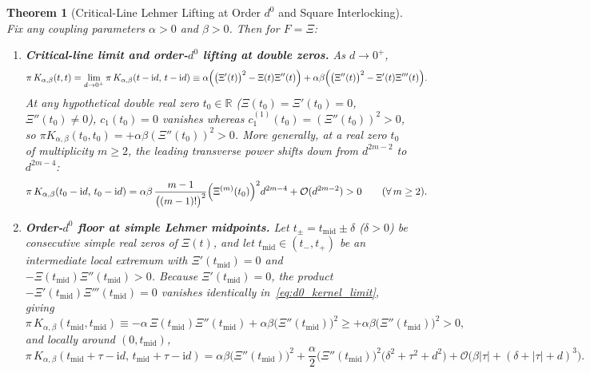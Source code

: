 \documentclass[11pt,reqno]{amsart}
\newtheorem{theorem}{Theorem}[section]
\theoremstyle{definition}
\theoremstyle{remark}
\numberwithin{equation}{section}
\newcommand{\R}{\mathbb{R}}
\newcommand{\ii}{\mathrm{i}}
\newcommand{\fac}{\mathclose{\mathchar"0021}}
\begin{document}
\begin{theorem}[Critical-Line Lehmer Lifting at Order $d^0$ and Square Interlocking]\label{thm:lehmer_lifting}
Fix any coupling parameters $\alpha > 0$ and $\beta > 0$. Then for $F = \Xi$:
\begin{enumerate}[label=\textup{(\roman*)},leftmargin=2.2em]
\item \textbf{Critical-line limit and order-$d^0$ lifting at double zeros.} As $d \to 0^+$,
\begin{equation}\label{eq:d0_kernel_limit}
\pi\,K_{\alpha,\beta}(t,t) = \lim_{d \to 0^+} \pi\,K_{\alpha,\beta}(t - \ii d,\, t - \ii d) \equiv \alpha\Bigl(\bigl(\Xi'(t)\bigr)^2 - \Xi(t)\Xi''(t)\Bigr) + \alpha\beta\Bigl(\bigl(\Xi''(t)\bigr)^2 - \Xi'(t)\Xi'''(t)\Bigr).
\end{equation}
At any hypothetical double real zero $t_0 \in \R$ ($\Xi(t_0) = \Xi'(t_0) = 0$, $\Xi''(t_0) \neq 0$), $c_1(t_0) = 0$ vanishes whereas $c_1^{(1)}(t_0) = (\Xi''(t_0))^2 > 0$, so $\pi K_{\alpha,\beta}(t_0, t_0) = +\alpha\beta(\Xi''(t_0))^2 > 0$. More generally, at a real zero $t_0$ of multiplicity $m \ge 2$, the leading transverse power shifts down from $d^{2m-2}$ to $d^{2m-4}$:
\begin{equation}\label{eq:mult_m_shift_down}
\pi\,K_{\alpha,\beta}(t_0 - \ii d,\, t_0 - \ii d) = \alpha\beta\,\frac{m-1}{\bigl((m-1)\fac\bigr)^2}\Bigl(\Xi^{(m)}(t_0)\Bigr)^2 d^{2m-4} + \mathcal{O}(d^{2m-2}) > 0 \qquad (\forall\, m \ge 2).
\end{equation}
\item \textbf{Order-$d^0$ floor at simple Lehmer midpoints.} Let $t_\pm = t_{\mathrm{mid}} \pm \delta$ ($\delta > 0$) be consecutive simple real zeros of $\Xi(t)$, and let $t_{\mathrm{mid}} \in (t_-, t_+)$ be an intermediate local extremum with $\Xi'(t_{\mathrm{mid}}) = 0$ and $-\Xi(t_{\mathrm{mid}})\Xi''(t_{\mathrm{mid}}) > 0$. Because $\Xi'(t_{\mathrm{mid}}) = 0$, the product $-\Xi'(t_{\mathrm{mid}})\Xi'''(t_{\mathrm{mid}}) = 0$ vanishes identically in~\eqref{eq:d0_kernel_limit}, giving
\begin{equation}\label{eq:lehmer_midpoint_exact}
\pi\,K_{\alpha,\beta}(t_{\mathrm{mid}}, t_{\mathrm{mid}}) \equiv -\alpha\,\Xi(t_{\mathrm{mid}})\Xi''(t_{\mathrm{mid}}) + \alpha\beta\bigl(\Xi''(t_{\mathrm{mid}})\bigr)^2 \ge +\alpha\beta\bigl(\Xi''(t_{\mathrm{mid}})\bigr)^2 > 0,
\end{equation}
and locally around $(0, t_{\mathrm{mid}})$,
\begin{equation}\label{eq:lifted_2d_lehmer_bowl}
\pi\,K_{\alpha,\beta}(t_{\mathrm{mid}} + \tau - \ii d,\, t_{\mathrm{mid}} + \tau - \ii d) = \alpha\beta\bigl(\Xi''(t_{\mathrm{mid}})\bigr)^2 + \frac{\alpha}{2}\bigl(\Xi''(t_{\mathrm{mid}})\bigr)^2\bigl(\delta^2 + \tau^2 + d^2\bigr) + \mathcal{O}\bigl(\beta|\tau| + (\delta + |\tau| + d)^3\bigr).

\end{equation}
\end{enumerate}
\end{theorem}
\end{document}
